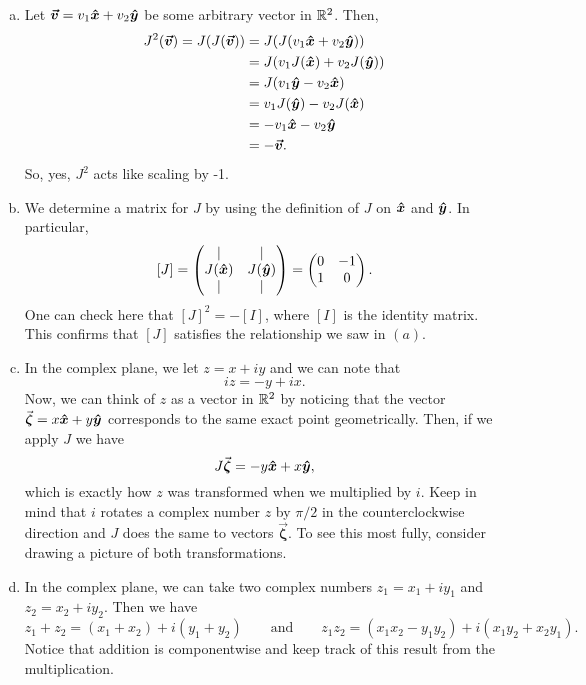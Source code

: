 \documentclass[12pt]{article} %
\begin{document}
\begin{solution}
    \begin{enumerate}[(a)]
        \item Let $\boldsymbol{\vec{v}} = v_1 \boldsymbol{\hat{x}} + v_2 \boldsymbol{\hat{y}}$ be some arbitrary vector in $\mathbb{R}^2$.  Then,
        \begin{align*}
            J^2(\boldsymbol{\vec{v}}) = J(J(\boldsymbol{\vec{v}})) &= J(J(v_1 \boldsymbol{\hat{x}} + v_2 \boldsymbol{\hat{y}}))\\
            &= J(v_1 J(\boldsymbol{\hat{x}}) + v_2 J(\boldsymbol{\hat{y}}))\\
            &= J(v_1 \boldsymbol{\hat{y}} - v_2 \boldsymbol{\hat{x}})\\
            &= v_1 J(\boldsymbol{\hat{y}}) - v_2J(\boldsymbol{\hat{x}})\\
            &= -v_1 \boldsymbol{\hat{x}} - v_2 \boldsymbol{\hat{y}}\\
            &= -\boldsymbol{\vec{v}}.
        \end{align*}
        So, yes, $J^2$ acts like scaling by -1.
        \item We determine a matrix for $J$ by using the definition of $J$ on $\boldsymbol{\hat{x}}$ and $\boldsymbol{\hat{y}}$. In particular,
        \[
            [J] = \begin{pmatrix} \vert & \vert \\ J(\boldsymbol{\hat{x}}) & J(\boldsymbol{\hat{y}}) \\ \vert & \vert \end{pmatrix} = \begin{pmatrix} 0 & -1 \\ 1 & 0 \end{pmatrix}.
        \]
        One can check here that $[J]^2=-[I]$, where $[I]$ is the identity matrix. This confirms that $[J]$ satisfies the relationship we saw in $(a)$.
        \item In the complex plane, we let $z=x+iy$ and we can note that
        \[
        iz = -y + ix.
        \]
        Now, we can think of $z$ as a vector in $\mathbb{R}^2$ by noticing that the vector $\vec{\boldsymbol{\zeta}} = x\boldsymbol{\hat{x}} + y\boldsymbol{\hat{y}}$ corresponds to the same exact point geometrically.  Then, if we apply $J$ we have
        \[
        J\vec{\boldsymbol{\zeta}} = -y\boldsymbol{\hat{x}} + x \boldsymbol{\hat{y}},
        \]
        which is exactly how $z$ was transformed when we multiplied by $i$. Keep in mind that $i$ rotates a complex number $z$ by $\pi/2$ in the counterclockwise direction and $J$ does the same to vectors $\vec{\boldsymbol{\zeta}}$. To see this most fully, consider drawing a picture of both transformations.
        \item In the complex plane, we can take two complex numbers $z_1 = x_1 + iy_1$ and $z_2 = x_2 + i y_2$. Then we have
        \[
        z_1 + z_2 = (x_1 + x_2) + i(y_1 + y_2) \qquad \textrm{and} \qquad z_1 z_2 = (x_1x_2 - y_1 y_2) + i(x_1 y_2 + x_2 y_1).
        \]
        Notice that addition is componentwise and keep track of this result from the multiplication.


\end{enumerate}
\end{solution}
\end{document}
